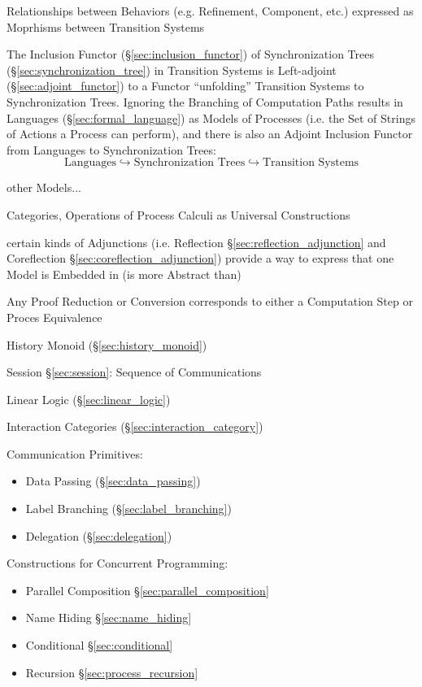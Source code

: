Relationships between Behaviors (e.g. Refinement, Component, etc.)
expressed as Moprhisms between Transition Systems

The Inclusion Functor (\S\ref{sec:inclusion_functor}) of
Synchronization Trees (\S\ref{sec:synchronization_tree}) in Transition
Systems is Left-adjoint (\S\ref{sec:adjoint_functor}) to a Functor
``unfolding'' Transition Systems to Synchronization Trees. Ignoring
the Branching of Computation Paths results in Languages
(\S\ref{sec:formal_language}) as Models of Processes (i.e. the Set of
Strings of Actions a Process can perform), and there is also an
Adjoint Inclusion Functor from Languages to Synchronization Trees:
\[
  \text{Languages} \hookrightarrow \text{Synchronization Trees}
    \hookrightarrow \text{Transition Systems}
\]

other Models...

Categories, Operations of Process Calculi as Universal Constructions

certain kinds of Adjunctions (i.e. Reflection
\S\ref{sec:reflection_adjunction} and Coreflection
\S\ref{sec:coreflection_adjunction}) provide a way to express that one
Model is Embedded in (is more Abstract than)


\asterism


Any Proof Reduction or Conversion corresponds to either a Computation
Step or Proces Equivalence \cite{caires-pfenning10}

History Monoid (\S\ref{sec:history_monoid})

Session \S\ref{sec:session}: Sequence of Communications

Linear Logic (\S\ref{sec:linear_logic})

Interaction Categories (\S\ref{sec:interaction_category})


Communication Primitives:
\begin{itemize}
  \item Data Passing (\S\ref{sec:data_passing})
  \item Label Branching (\S\ref{sec:label_branching})
  \item Delegation (\S\ref{sec:delegation})
\end{itemize}


Constructions for Concurrent Programming:
\cite{honda-vasconcelos-kubo98}
\begin{itemize}
  \item Parallel Composition \S\ref{sec:parallel_composition}
  \item Name Hiding \S\ref{sec:name_hiding}
  \item Conditional \S\ref{sec:conditional}
  \item Recursion \S\ref{sec:process_recursion}
\end{itemize}

